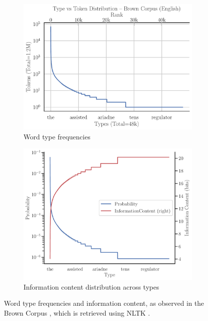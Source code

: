 \begin{figure}[ht]
    \centering
    \begin{subfigure}[t]{0.49\linewidth}
    \includegraphics[width=\textwidth,trim={0 0 10mm 8.8mm}, clip]{img/background/brown-corpus-zipf.pdf}
    \caption{Word type frequencies}
    \label{fig:brown-freqs}
    \end{subfigure}
    \begin{subfigure}[t]{0.49\linewidth}
    \includegraphics[width=\textwidth,trim={0 0 0 8.8mm},clip] {img/background/brown-corpus-shannons.pdf}
    \caption{Information content distribution across types}
    \label{fig:brown-shannons}
    \end{subfigure}
    
    \caption{Word type frequencies and information content, as observed in the Brown Corpus \cite{kuvcera1967brown-corpus}, which is retrieved using NLTK \cite{bird-2006-nltk}.}%
\end{figure}

